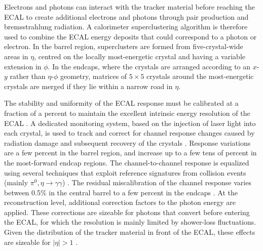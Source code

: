 \documentclass[11pt,twoside,a4paper,cmspaper,final,collab]{cms-tdr}
\begin{document}
Electrons and photons can interact with the tracker material before reaching
the ECAL to create additional electrons and photons through pair
production and bremsstrahlung radiation.
A calorimeter superclustering algorithm is therefore used to combine
the ECAL energy deposits that could correspond to a photon or electron.
In the barrel region, superclusters are formed from five-crystal-wide areas
in $\eta$, centred on the locally most-energetic crystal and
having a variable extension in $\phi$.
In the endcaps, where the crystals are arranged according to an $x$-$y$ rather than $\eta$-$\phi$ geometry,
matrices of $5\times5$ crystals
around the most-energetic crystals are merged if they lie within
a narrow road in $\eta$.

The stability and uniformity of the ECAL response must be
calibrated at a fraction of a percent to maintain the excellent intrinsic
energy resolution of the ECAL \cite{ECAL-EnergyResol}. %
A dedicated monitoring system, based on the injection of laser light
into each crystal, is used to track and correct for channel response
changes caused by radiation damage and subsequent recovery of the crystals
\cite{ECAL-LaserMonit}. Response variations are a few percent in the
barrel region, and increase up to a few tens of percent in the most-forward
endcap regions.
The channel-to-channel response is equalized using several techniques
that exploit reference signatures from collision events (mainly
$\pi^0, \eta \to \gamma\gamma$) \cite{ECAL-Calibrations}. %
The residual miscalibration of the channel response
varies between 0.5\% in the central barrel to a few percent in
the endcaps \cite{ECAL-Role}.
At the reconstruction level, additional correction factors to the
photon energy are applied.
These corrections are sizeable for photons that convert before entering the ECAL, for
which the resolution is mainly limited by shower-loss
fluctuations. Given the distribution of the tracker material in front
of the ECAL, these effects are sizeable for $|\eta|>1$  \cite{ECAL-Role}.
\end{document}
